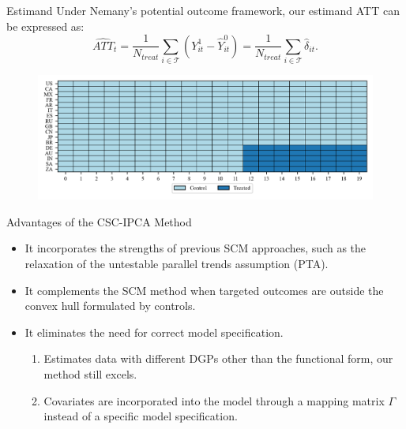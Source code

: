 \documentclass{beamer}
\begin{document}
\begin{frame}{Estimand}
Under Nemany's potential outcome framework, our estimand ATT can be expressed as:
\begin{equation*}
    \widehat{ATT}_{t} = \frac{1}{N_{treat}}\sum_{i \in \mathcal{T}} \left( Y_{it}^1 - \hat{Y}_{it}^0 \right) = \frac{1}{N_{treat}}\sum_{i \in \mathcal{T}}\hat{\delta}_{it}.
\end{equation*}

\begin{figure}
    \centering
    \includegraphics[scale=0.5]{figs/block_assignment.png}
\end{figure}
\end{frame}

\begin{frame}{Advantages of the CSC-IPCA Method}
    \begin{itemize}
        \item It incorporates the strengths of previous SCM approaches, such as the relaxation of the untestable parallel trends assumption (PTA).
        \item It complements the SCM method when targeted outcomes are outside the convex hull formulated by controls.
        \item It eliminates the need for correct model specification.
        \begin{enumerate}
            \item Estimates data with different DGPs other than the functional form, our method still excels.
            \item Covariates are incorporated into the model through a mapping matrix $\Gamma$ instead of a specific model specification.
        \end{enumerate}
    \end{itemize}
\end{frame}
\end{document}
